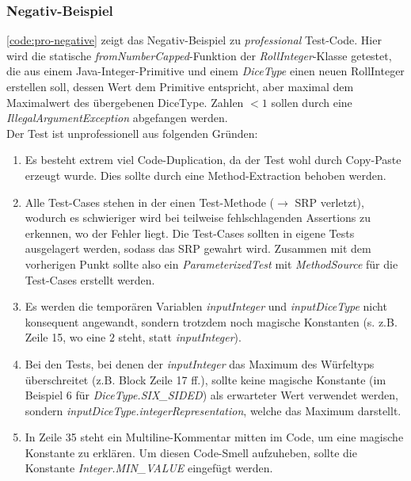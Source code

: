 \subsubsection{Negativ-Beispiel}

\autoref{code:pro-negative} zeigt das Negativ-Beispiel zu \textit{professional} Test-Code. Hier wird die 
statische \textit{fromNumberCapped}-Funktion der \textit{RollInteger}-Klasse getestet, die aus einem Java-Integer-Primitive und 
einem \textit{DiceType} einen neuen RollInteger erstellen soll, dessen Wert dem Primitive entspricht, aber maximal 
dem Maximalwert des übergebenen DiceType. Zahlen $< 1$ sollen durch eine \textit{IllegalArgumentException} abgefangen werden. \\
Der Test ist unprofessionell aus folgenden Gründen:
\begin{enumerate}
	\item Es besteht extrem viel Code-Duplication, da der Test wohl durch Copy-Paste erzeugt wurde. 
	Dies sollte durch eine Method-Extraction behoben werden. 
	\item Alle Test-Cases stehen in der einen Test-Methode ($\rightarrow$ SRP verletzt), wodurch es schwieriger wird bei 
	teilweise fehlschlagenden Assertions zu erkennen, wo der Fehler liegt. Die Test-Cases sollten in eigene Tests ausgelagert werden, 
	sodass das SRP gewahrt wird. Zusammen mit dem vorherigen Punkt sollte also ein \textit{ParameterizedTest} mit \textit{MethodSource}
	für die Test-Cases erstellt werden.
	\item Es werden die temporären Variablen \textit{inputInteger} und \textit{inputDiceType} nicht konsequent angewandt, 
	sondern trotzdem noch magische Konstanten (s. z.B. Zeile 15, wo eine $2$ steht, statt \textit{inputInteger}). 
	\item Bei den Tests, bei denen der \textit{inputInteger} das Maximum des Würfeltyps überschreitet (z.B. Block Zeile 17 ff.), 
	sollte keine magische Konstante (im Beispiel $6$ für \textit{DiceType.SIX\_SIDED}) als erwarteter Wert verwendet werden,
	sondern \textit{inputDiceType.integerRepresentation}, welche das Maximum darstellt.
	\item In Zeile 35 steht ein Multiline-Kommentar mitten im Code, um eine magische Konstante zu erklären. Um diesen Code-Smell aufzuheben,
	sollte die Konstante \textit{Integer.MIN\_VALUE} eingefügt werden.
\end{enumerate}



